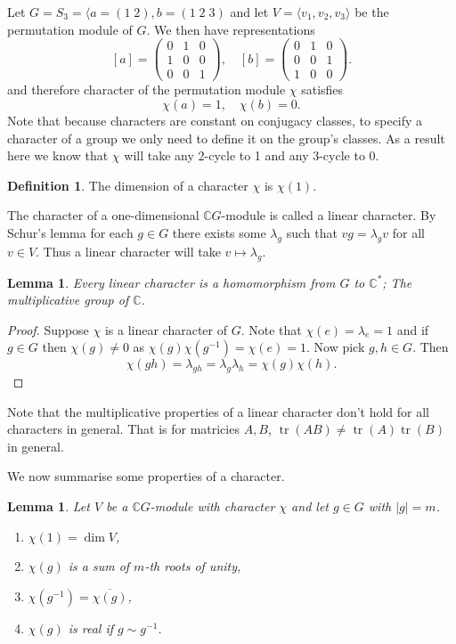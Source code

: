 \documentclass[11pt, notitlepage]{article}
\numberwithin{equation}{section}
\theoremstyle{plain}
\newtheorem{lemma}[theorem]{Lemma}
\theoremstyle{definition}
\newtheorem{definition}[theorem]{Definition}
\newenvironment{example}
	{\pushQED{\qed}\renewcommand{\qedsymbol}{$\blacktriangleleft$}\examplex}
	{\popQED\endexamplex}
\DeclareMathOperator{\tr}{tr}
\begin{document}
\begin{example}
Let $G = S_3 = \langle a=(1\;2),b=(1\;2\;3)$ and let $V = \langle v_1,v_2,v_3 \rangle$ be the permutation module of $G$. We then have representations
\[
	[a] = \begin{pmatrix} 0&1&0\\ 1&0&0\\ 0&0&1 \end{pmatrix}, \quad
	[b] = \begin{pmatrix} 0&1&0\\ 0&0&1\\ 1&0&0 \end{pmatrix}.
\]
and therefore character of the permutation module $\chi$ satisfies
\[
	\chi(a) = 1, \quad \chi(b) = 0.
\]
Note that because characters are constant on conjugacy classes, to specify a character of a group we only need to define it on the group's classes. As a result here we know that $\chi$ will take any 2-cycle to 1 and any 3-cycle to 0.
\end{example}

\begin{definition}
The dimension of a character $\chi$ is $\chi(1)$.
\end{definition}

The character of a one-dimensional $\mathbb{C}G$-module is called a linear character. By Schur's lemma for each $g\in G$ there exists some $\lambda_g$ such that $vg = \lambda_gv$ for all $v\in V$. Thus a linear character will take $v\mapsto \lambda_g$.

\begin{lemma}
	Every linear character is a homomorphism from $G$ to $\mathbb{C}^*$; The multiplicative group of $\mathbb{C}$.
\end{lemma}

\begin{proof}
Suppose $\chi$ is a linear character of $G$. Note that $\chi(e) = \lambda_e = 1$ and if $g\in G$ then $\chi(g)\neq 0$ as $\chi(g)\chi(g^{-1}) = \chi(e) = 1$. Now pick $g,h\in G$. Then 
\[
	\chi(gh) = \lambda_{gh} = \lambda_g\lambda_h = \chi(g)\chi(h).
\]
\end{proof}

Note that the multiplicative properties of a linear character don't hold for all characters in general. That is for matricies $A,B$, $\tr(AB) \neq \tr(A)\tr(B)$ in general.

We now summarise some properties of a character.

\begin{lemma}\label{Lem:Charm}
Let $V$ be a $\mathbb{C}G$-module with character $\chi$ and let $g\in G$ with $|g|=m$.
\begin{enumerate}[label=\emph{(\Roman*)}]
	\item $\chi(1) = \dim V$,
	\item $\chi(g)$ is a sum of $m$-th roots of unity,
	\item $\chi(g^{-1}) = \overline{\chi(g)}$,
	\item $\chi(g)$ is real if $g\sim g^{-1}$.
\end{enumerate}
\end{lemma}
\end{document}
